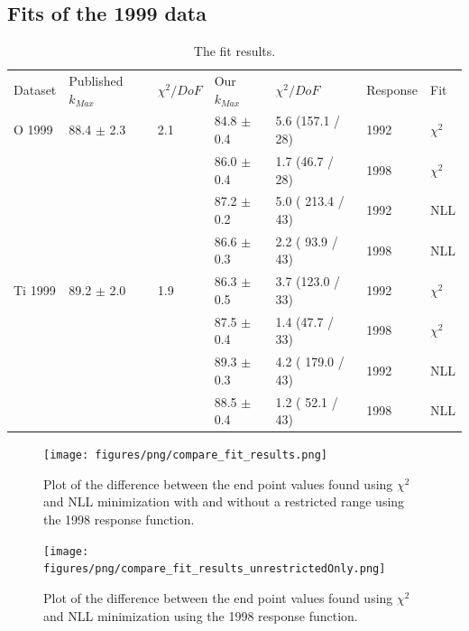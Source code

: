 \subsection { Fits of the 1999 data }

\begin{table}[H]
  \begin{center}
    \begin{tabular}{|l||l|l|l|l|l|l|}
      \hline
      Dataset & Published $k_{Max}$ & $\chi^2 / DoF$ & Our $k_{Max}$ & $\chi^2 / DoF$  & Response & Fit \\
      \hhline{|=||=|=|=|=|=|=|}
       O 1999    & 88.4 $\pm$ 2.3 & 2.1 & 84.8 $\pm$ 0.4 &  5.6 (157.1 / 28)& 1992 & $\chi^2$ \\  
                 &                &     & 86.0 $\pm$ 0.4 &  1.7 (46.7 / 28) & 1998 & $\chi^2$ \\  
                                                                             
                 &                &     & 87.2 $\pm$ 0.2 & 5.0 ( 213.4 / 43)& 1992 & NLL\\
                 &                &     & 86.6 $\pm$ 0.3 & 2.2 ( 93.9 / 43) & 1998 & NLL\\
      \hline                                                                 
       Ti 1999   & 89.2 $\pm$ 2.0 & 1.9 & 86.3 $\pm$ 0.5 &  3.7 (123.0 / 33)& 1992 & $\chi^2$ \\  
                 &                &     & 87.5 $\pm$ 0.4 &  1.4 (47.7 / 33) & 1998 & $\chi^2$ \\  
                                                                             
                 &                &     & 89.3 $\pm$ 0.3 & 4.2 ( 179.0 / 43) & 1992 & NLL \\
                 &                &     & 88.5 $\pm$ 0.4 & 1.2 ( 52.1 / 43) & 1998 & NLL \\
      \hline                           
    \end{tabular}
  \end{center}
  \caption{The fit results.}
  \label{table:fits1999}
\end{table}

\begin{figure}[h]
  \centering
  \texttt{[image: figures/png/compare\_fit\_results.png]}
  \caption{Plot of the difference between the end point values found using $\chi^2$ and
    NLL minimization with and without a restricted range using the 1998 response function.}
  \label{fig:compareFits}
\end{figure}

\begin{figure}[h]
  \centering
  \texttt{[image: figures/png/compare\_fit\_results\_unrestrictedOnly.png]}
  \caption{Plot of the difference between the end point values found using $\chi^2$ and
    NLL minimization using the 1998 response function.}
  \label{fig:compareFits}
\end{figure}



